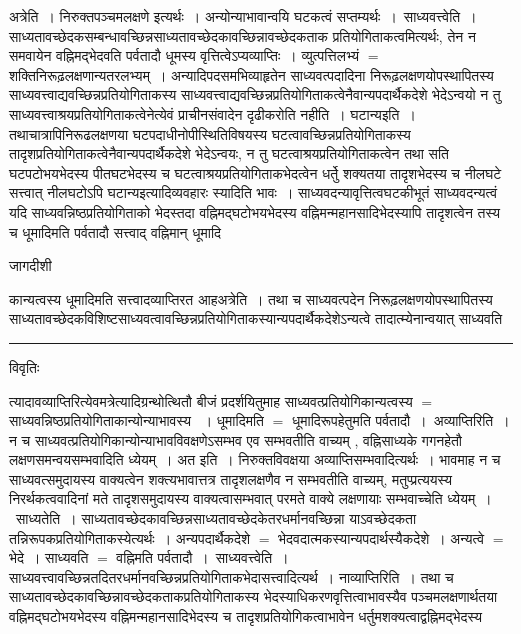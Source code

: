\documentclass[10pt, openany]{book}
\begin{document}
{{  अत्रेति~।} निरुक्तपञ्चमलक्षणे इत्यर्थः~। अन्योन्याभावान्वयि घटकत्वं सप्तम्यर्थः~।~{\la साध्यवत्त्वेति~।}
साध्यतावच्छेदकसम्बन्धावच्छिन्नसाध्यतावच्छेदकावच्छिन्नावच्छेदकताक प्रतियोगिताकत्वमित्यर्थः, तेन न समवायेन वह्निमद्भेदवति पर्वतादौ धूमस्य वृत्तित्वेऽप्यव्याप्तिः~।
व्युत्पत्तिलभ्यं  $=$ शक्तिनिरूढ़लक्षणान्यतरलभ्यम्~। अन्यादिपदसमभिव्याहृतेन साध्यवत्पदादिना निरूढ़लक्षणयोपस्थापितस्य साध्यवत्त्वाद्यवच्छिन्नप्रतियोगिताकस्य
साध्यवत्त्वाद्यवच्छिन्नप्रतियोगिताकत्वेनैवान्यपदार्थैकदेशे भेदेऽन्वयो न तु साध्यवत्त्वाश्रयप्रतियोगिताकत्वेनेत्येवं प्राचीनसंवादेन दृढीकरोति {\la नहीति~। घटान्यइति~।} तथाचात्रापिनिरूढलक्षणया घटपदाधीनोपीस्थितिविषयस्य घटत्वावच्छिन्नप्रतियोगिताकस्य तादृशप्रतियोगिताकत्वेनैवान्यपदार्थैकदेशे भेदेऽन्वयः, न तु
घटत्वाश्रयप्रतियोगिताकत्वेन तथा सति घटपटोभयभेदस्य पीतघटभेदस्य च घटत्वाश्रयप्रतियोगिताकभेदत्वेन धर्तेु  शक्यतया तादृशभेदस्य च नीलघटे सत्त्वात् नीलघटोऽपि घटान्यइत्यादिव्यवहारः स्यादिति भावः~। साध्यवदन्यावृत्तित्वघटकीभूतं साध्यवदन्यत्वं यदि साध्यवन्निष्ठप्रतियोगिताको भेदस्तदा वह्निमद्घटोभयभेदस्य वह्निमन्महानसादिभेदस्यापि तादृशत्वेन तस्य च धूमादिमति पर्वतादौ सत्त्वाद् वह्निमान् धूमादि
\newpage
\lfoot{}
\begin{center} जागदीशी \end{center}
{\la कान्यत्वस्य धूमादिमति सत्त्वादव्याप्तिरत आह\textendash अत्रेति~। तथा च साध्यवत्पदेन निरूढ़लक्षणयोपस्थापितस्य साध्यतावच्छेदकविशिष्टसाध्यवत्वावच्छिन्नप्रतियोगिताकस्यान्यपदार्थैकदेशेऽन्यत्वे तादात्म्येनान्वयात् साध्यवति}\\
\hrule
\begin{center}     विवृतिः \end{center}
त्यादावव्याप्तिरित्येवमत्रेत्यादिग्रन्थोत्थितौ बीजं प्रदर्शयितुमाह साध्यवत्प्रतियोगिकान्यत्वस्य $=$ साध्यवन्निष्ठप्रतियोगिताकान्योन्याभावस्य
~। धूमादिमति $=$ धूमादिरूपहेतुमति पर्वतादौ~।~{\la अव्याप्तिरिति~।} न च साध्यवत्प्रतियोगिकान्योन्याभावविवक्षणेऽसम्भव एव सम्भवतीति वाच्यम् , वह्निसाध्यके
गगनहेतौ लक्षणसमन्वयसम्भवादिति ध्येयम्~। अत इति~। निरुक्तविवक्षया अव्याप्तिसम्भवादित्यर्थः~। भावमाह न च
साध्यवत्समुदायस्य वाक्यत्वेन शक्त्यभावात्तत्र तादृशलक्षणैव न सम्भवतीति वाच्यम्, मतुप्प्रत्ययस्य निरर्थकत्ववादिनां मते तादृशसमुदायस्य वाक्यत्वासम्भवात् परमते वाक्ये लक्षणायाः सम्भवाच्चेति ध्येयम्~।~{\la साध्यतेति~।} साध्यतावच्छेदकावच्छिन्नसाध्यतावच्छेदकेतरधर्मानवच्छिन्ना याऽवच्छेदकता तन्निरूपकप्रतियोगिताकस्येत्यर्थः~।
अन्यपदार्थैकदेशे $=$ भेदवदात्मकस्यान्यपदार्थस्यैकदेशे~। अन्यत्वे $=$ भेदे~। साध्यवति $=$ वह्निमति पर्वतादौ~।~{\la साध्यवत्त्वेति~।} साध्यवत्त्वावच्छिन्नतदितरधर्मानवच्छिन्नप्रतियोगिताकभेदासत्त्वादित्यर्थ~। {\la नाव्याप्तिरिति~।} तथा च साध्यतावच्छेदकावच्छिन्नावच्छेदकताकप्रतियोगिताकस्य भेदस्याधिकरणवृत्तित्वाभावस्यैव पञ्चमलक्षणार्थतया वह्निमद्घटोभयभेदस्य वह्निमन्महानसादिभेदस्य च तादृशप्रतियोगिकत्वाभावेन धर्तुमशक्यत्वाद्वह्निमद्भेदस्य
}
\end{document}
